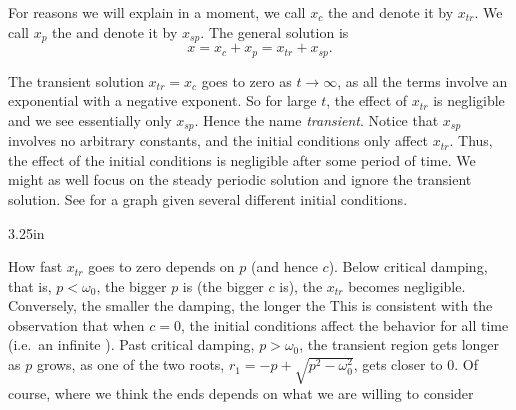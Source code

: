 \medskip

For reasons we will explain in a moment, we call $x_c$ the
\emph{}
and denote it by $x_{tr}$.  We call
$x_p$ the \emph{} and denote it
by $x_{sp}$.
The general solution is
\begin{equation*}
x = x_c + x_p = x_{tr} + x_{sp} .
\end{equation*}

The transient solution $x_{tr} = x_c$ goes to zero as $t \to \infty$,
as all the terms involve an exponential with a negative exponent.  So
for large $t$, the effect of $x_{tr}$ is negligible and we see essentially
only $x_{sp}$.
Hence the name \emph{transient}.
Notice that $x_{sp}$ involves no arbitrary constants, and
the initial conditions only affect $x_{tr}$.  Thus, the effect
of the initial conditions is negligible after some period of time.
We might as well focus on the
steady periodic solution and ignore the transient solution.  See
 for a graph given several different initial conditions.

\begin{mywrapfig}[15]{3.25in}
\capstart
{}
\caption{Solutions with different initial conditions for parameters
$k=1$, $m=1$, $F_0 = 1$, $c=0.7$, and $\omega=1.1$.\label{3.6:transbehfig}}
\end{mywrapfig}

How fast $x_{tr}$ goes to zero depends on $p$
(and hence $c$).
Below critical damping, that is, $p < \omega_0$,
the bigger $p$ is (the bigger $c$ is),
the  $x_{tr}$ becomes negligible.
Conversely, the smaller the damping, the longer the 
This is consistent
with the observation that when $c=0$, the initial conditions affect the
behavior for all time (i.e.\ an infinite ).
Past critical damping, $p > \omega_0$, the transient
region gets longer as $p$ grows, as one of
the two roots, $r_1 = -p + \sqrt{p^2-\omega_0^2}$, gets closer to $0$.
Of course, where we think the  ends
depends on what we are willing to consider 

\medskip

